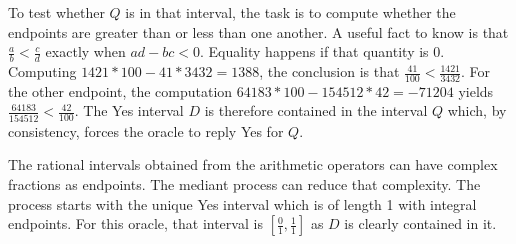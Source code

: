 \documentclass[12pt]{article}
\theoremstyle{remark}
\begin{document}
To test whether $Q$ is in that interval, the task is to compute whether the endpoints are greater than or less than one another. A useful fact to know is that $\frac{a}{b} < \frac{c}{d}$ exactly when $ad - bc < 0$. Equality happens if that quantity is 0. Computing $1421*100 - 41*3432 = 1388$, the conclusion is that $\frac{41}{100} < \frac{1421}{3432}$. For the other endpoint, the computation $64183*100 - 154512*42 = -71204$ yields $ \frac{64183}{154512} < \frac{42}{100}$. The Yes interval $D$ is therefore contained in the interval $Q$ which, by consistency, forces the oracle to reply Yes for $Q$. 

The rational intervals obtained from the arithmetic operators can have complex fractions as endpoints. The mediant process can reduce that complexity. The process starts with the unique Yes interval which is of length 1 with integral endpoints. For this oracle, that interval is $[\frac{0}{1},\frac{1}{1}]$ as $D$ is clearly contained in it. 
\end{document}

